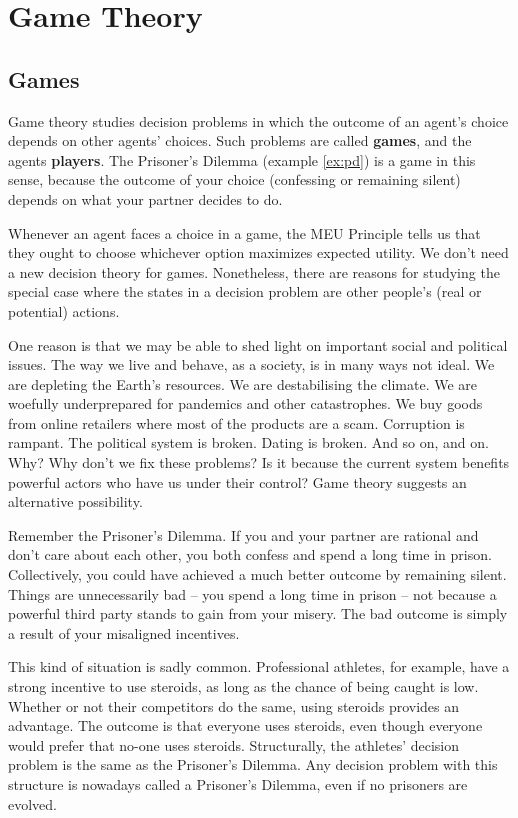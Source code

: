 \chapter{Game Theory}\label{ch:gametheory}

\section{Games}\label{sec:games}

Game theory studies decision problems in which the outcome of an agent's choice
depends on other agents' choices. Such problems are called \textbf{games}, and
the agents \textbf{players}. The Prisoner's Dilemma (example \ref{ex:pd}) is a
game in this sense, because the outcome of your choice (confessing or remaining
silent) depends on what your partner decides to do.

Whenever an agent faces a choice in a game, the MEU Principle tells us that they
ought to choose whichever option maximizes expected utility. We don't need a new
decision theory for games. Nonetheless, there are reasons for studying the
special case where the states in a decision problem are other people's (real or
potential) actions.

One reason is that we may be able to shed light on important social and
political issues. The way we live and behave, as a society, is in many ways not
ideal. We are depleting the Earth's resources. We are destabilising the climate.
We are woefully underprepared for pandemics and other catastrophes. We buy goods
from online retailers where most of the products are a scam. Corruption is
rampant. The political system is broken. Dating is broken. And so on, and on.
Why? Why don't we fix these problems? Is it because the current system benefits
powerful actors who have us under their control? Game theory suggests an
alternative possibility.

Remember the Prisoner's Dilemma. If you and your partner are rational and don't
care about each other, you both confess and spend a long time in prison.
Collectively, you could have achieved a much better outcome by remaining silent.
Things are unnecessarily bad -- you spend a long time in prison -- not because a
powerful third party stands to gain from your misery. The bad outcome is simply
a result of your misaligned incentives.

This kind of situation is sadly common. Professional athletes, for example, have
a strong incentive to use steroids, as long as the chance of being caught is
low. Whether or not their competitors do the same, using steroids provides an
advantage. The outcome is that everyone uses steroids, even though everyone
would prefer that no-one uses steroids. Structurally, the athletes' decision
problem is the same as the Prisoner's Dilemma. Any decision problem with this
structure is nowadays called a Prisoner's Dilemma, even if no prisoners are
evolved.

